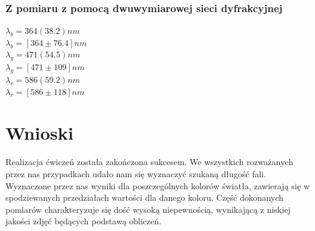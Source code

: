 \documentclass{article}
\begin{document}
\subsubsection{Z pomiaru z pomocą dwuwymiarowej sieci dyfrakcyjnej}
$\lambda_b=364(38.2)nm$\\
$\lambda_b=[364\pm76.4]nm$\\
$\lambda_g=471(54.5)nm$\\
$\lambda_g=[471\pm109]nm$\\
$\lambda_r=586(59.2)nm$\\
$\lambda_r=[586\pm118]nm$

\section{Wnioski}
Realizacja ćwiczeń została zakończona sukcesem. We wszystkich rozważanych przez nas przypadkach udało nam się wyznaczyć szukaną długość fali. Wyznaczone przez nas wyniki dla poszczególnych kolorów światła, zawierają się w spodziewanych przedziałach wartości dla danego koloru. Część dokonanych pomiarów charakteryzuje się dość wysoką niepewnością, wynikającą z niskiej jakości zdjęć będących podstawą obliczeń.
\end{document}
